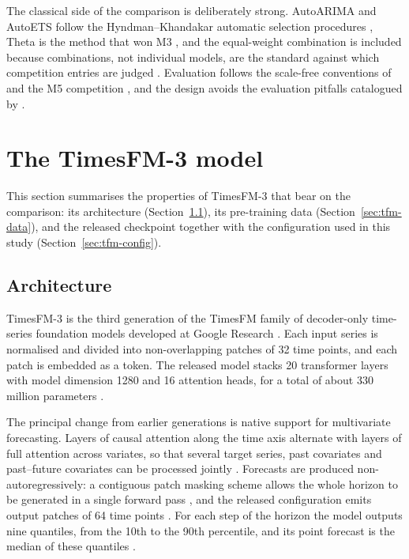 \documentclass[article]{ajs}
\providecommand{\sectionref}[1]{Section~\ref{#1}}
\begin{document}
The classical side of the comparison is deliberately strong. AutoARIMA and AutoETS follow the
Hyndman--Khandakar automatic selection procedures \citep{hyndman2008forecast,
hyndman2002statespace}, Theta is the method that won M3 \citep{assimakopoulos2000theta}, and
the equal-weight combination is included because combinations, not individual models, are the
standard against which competition entries are judged \citep{makridakis2020m4}. Evaluation
follows the scale-free conventions of \citet{hyndman2006mase} and the M5 competition
\citep{makridakis2022m5, makridakis2022m5unc}, and the design avoids the
evaluation pitfalls catalogued by \citet{hewamalage2023evaluation}.

\section{The TimesFM-3 model}
\label{sec:timesfm}

This section summarises the properties of TimesFM-3 that bear on the comparison: its
architecture (\sectionref{sec:tfm-architecture}), its pre-training data
(\sectionref{sec:tfm-data}), and the released checkpoint together with the configuration used in
this study (\sectionref{sec:tfm-config}).

\subsection{Architecture}
\label{sec:tfm-architecture}

TimesFM-3 is the third generation of the TimesFM family of decoder-only time-series foundation
models developed at Google Research \citep{das2024timesfm, timesfm3blog}. Each input series is
normalised and divided into non-overlapping patches of 32 time points, and each patch is
embedded as a token. The released model stacks 20 transformer layers with model dimension 1280
and 16 attention heads, for a total of about 330 million parameters
\citep{timesfm3blog, timesfm3card}.

The principal change from earlier generations is native support for multivariate forecasting.
Layers of causal attention along the time axis alternate with layers of full attention across
variates, so that several target series, past covariates and past--future covariates can be
processed jointly \citep{timesfm3blog}. Forecasts are produced non-autoregressively: a contiguous
patch masking scheme allows the whole horizon to be generated in a single forward pass
\citep{timesfm3blog}, and the released configuration emits output patches of 64 time points
\citep{timesfm3card}. For each step of the horizon the model outputs nine quantiles, from the
10th to the 90th percentile, and its point forecast is the median of these quantiles
\citep{timesfm3blog, timesfm3repo}.
\end{document}
